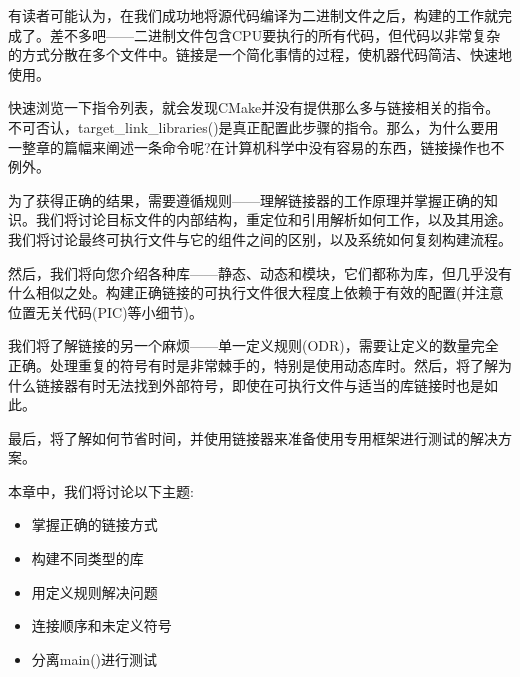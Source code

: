 有读者可能认为，在我们成功地将源代码编译为二进制文件之后，构建的工作就完成了。差不多吧——二进制文件包含CPU要执行的所有代码，但代码以非常复杂的方式分散在多个文件中。链接是一个简化事情的过程，使机器代码简洁、快速地使用。

快速浏览一下指令列表，就会发现CMake并没有提供那么多与链接相关的指令。不可否认，target\_link\_libraries()是真正配置此步骤的指令。那么，为什么要用一整章的篇幅来阐述一条命令呢?在计算机科学中没有容易的东西，链接操作也不例外。

为了获得正确的结果，需要遵循规则——理解链接器的工作原理并掌握正确的知识。我们将讨论目标文件的内部结构，重定位和引用解析如何工作，以及其用途。我们将讨论最终可执行文件与它的组件之间的区别，以及系统如何复刻构建流程。

然后，我们将向您介绍各种库——静态、动态和模块，它们都称为库，但几乎没有什么相似之处。构建正确链接的可执行文件很大程度上依赖于有效的配置(并注意位置无关代码(PIC)等小细节)。

我们将了解链接的另一个麻烦——单一定义规则(ODR)，需要让定义的数量完全正确。处理重复的符号有时是非常棘手的，特别是使用动态库时。然后，将了解为什么链接器有时无法找到外部符号，即使在可执行文件与适当的库链接时也是如此。

最后，将了解如何节省时间，并使用链接器来准备使用专用框架进行测试的解决方案。

本章中，我们将讨论以下主题:

\begin{itemize}
\item 
掌握正确的链接方式

\item 
构建不同类型的库

\item 
用定义规则解决问题

\item 
连接顺序和未定义符号

\item 
分离main()进行测试
\end{itemize}